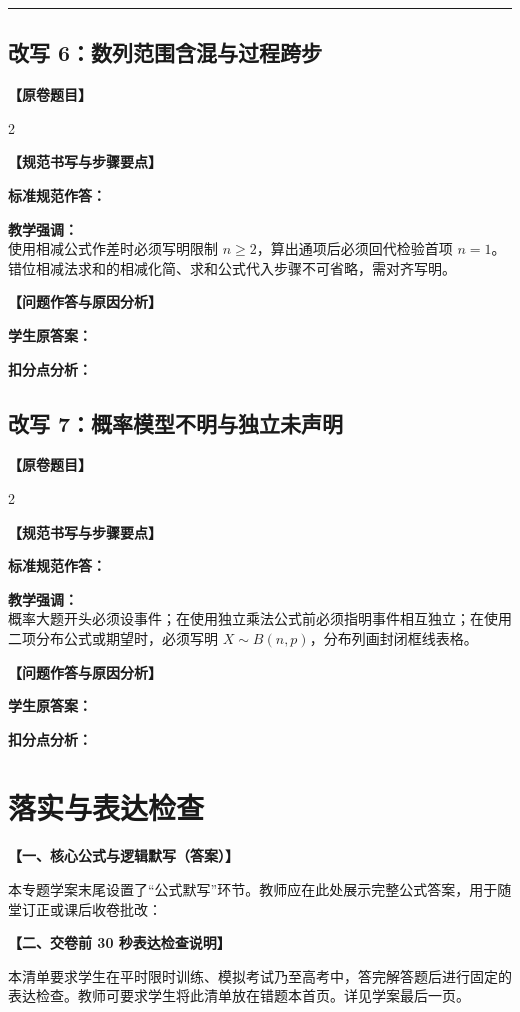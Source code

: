 \documentclass[11pt,a4paper]{ctexart}
\newcommand{\teachblock}[2]{%
  \par\addvspace{0.55em}%
  \noindent\textbf{【#1】}\par\nobreak
  \begingroup
    \raggedright
    \setlength{\parskip}{0.35em}%
    #2\par
  \endgroup
}
\begin{document}
\addvspace{1.0em}
\hrule
\addvspace{1.0em}

\subsection{改写 6：数列范围含混与过程跨步}
\noindent\textbf{【原卷题目】} \qGeneralExampleSixStem

\begin{paracol}{2}
\teachblock{规范书写与步骤要点}{
  \textbf{标准规范作答：}\\
  \qBadSequenceCorrect\par
  \textbf{教学强调：}\\
  使用相减公式作差时必须写明限制 \(n \ge 2\)，算出通项后必须回代检验首项 \(n=1\)。错位相减法求和的相减化简、求和公式代入步骤不可省略，需对齐写明。
}

\switchcolumn
\teachblock{问题作答与原因分析}{
  \textbf{学生原答案：}\\
  \qBadSequenceWriteup\par
  \textbf{扣分点分析：}\\
  \qBadSequenceReason
}
\end{paracol}

\newpage

\subsection{改写 7：概率模型不明与独立未声明}
\noindent\textbf{【原卷题目】} \qGeneralExampleSevenStem

\begin{paracol}{2}
\teachblock{规范书写与步骤要点}{
  \textbf{标准规范作答：}\\
  \qBadProbabilityCorrect\par
  \textbf{教学强调：}\\
  概率大题开头必须设事件；在使用独立乘法公式前必须指明事件相互独立；在使用二项分布公式或期望时，必须写明 \(X \sim B(n,p)\)，分布列画封闭框线表格。
}

\switchcolumn
\teachblock{问题作答与原因分析}{
  \textbf{学生原答案：}\\
  \qBadProbabilityWriteup\par
  \textbf{扣分点分析：}\\
  \qBadProbabilityReason
}
\end{paracol}

\newpage

\section{落实与表达检查}

\teachblock{一、核心公式与逻辑默写（答案）}{
  本专题学案末尾设置了“公式默写”环节。教师应在此处展示完整公式答案，用于随堂订正或课后收卷批改：
  
  \begingroup
  \large
  \renewcommand{\arraystretch}{1.55}
  \linespread{1.35}\selectfont
  \showprompttrue
  \topicformulas
  \endgroup
}

\teachblock{二、交卷前 30 秒表达检查说明}{
  本清单要求学生在平时限时训练、模拟考试乃至高考中，答完解答题后进行固定的表达检查。教师可要求学生将此清单放在错题本首页。详见学案最后一页。
}
\end{document}
